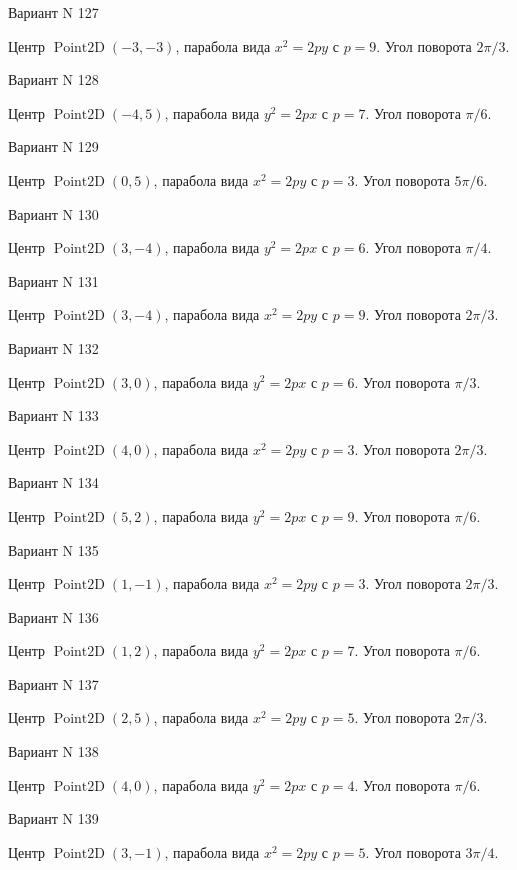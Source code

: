 \documentclass[11pt]{report}
\begin{document}
Вариант N 127

Центр $\operatorname{Point2D}\left(-3, -3\right)$, парабола вида $x^{2} = 2py$ с $p = 9$. Угол поворота $2 \pi / 3$.

Вариант N 128

Центр $\operatorname{Point2D}\left(-4, 5\right)$, парабола вида $y^{2} = 2px$ с $p = 7$. Угол поворота $\pi / 6$.

Вариант N 129

Центр $\operatorname{Point2D}\left(0, 5\right)$, парабола вида $x^{2} = 2py$ с $p = 3$. Угол поворота $5 \pi / 6$.

Вариант N 130

Центр $\operatorname{Point2D}\left(3, -4\right)$, парабола вида $y^{2} = 2px$ с $p = 6$. Угол поворота $\pi / 4$.

Вариант N 131

Центр $\operatorname{Point2D}\left(3, -4\right)$, парабола вида $x^{2} = 2py$ с $p = 9$. Угол поворота $2 \pi / 3$.

Вариант N 132

Центр $\operatorname{Point2D}\left(3, 0\right)$, парабола вида $y^{2} = 2px$ с $p = 6$. Угол поворота $\pi / 3$.

Вариант N 133

Центр $\operatorname{Point2D}\left(4, 0\right)$, парабола вида $x^{2} = 2py$ с $p = 3$. Угол поворота $2 \pi / 3$.

Вариант N 134

Центр $\operatorname{Point2D}\left(5, 2\right)$, парабола вида $y^{2} = 2px$ с $p = 9$. Угол поворота $\pi / 6$.

Вариант N 135

Центр $\operatorname{Point2D}\left(1, -1\right)$, парабола вида $x^{2} = 2py$ с $p = 3$. Угол поворота $2 \pi / 3$.

Вариант N 136

Центр $\operatorname{Point2D}\left(1, 2\right)$, парабола вида $y^{2} = 2px$ с $p = 7$. Угол поворота $\pi / 6$.

Вариант N 137

Центр $\operatorname{Point2D}\left(2, 5\right)$, парабола вида $x^{2} = 2py$ с $p = 5$. Угол поворота $2 \pi / 3$.

Вариант N 138

Центр $\operatorname{Point2D}\left(4, 0\right)$, парабола вида $y^{2} = 2px$ с $p = 4$. Угол поворота $\pi / 6$.

Вариант N 139

Центр $\operatorname{Point2D}\left(3, -1\right)$, парабола вида $x^{2} = 2py$ с $p = 5$. Угол поворота $3 \pi / 4$.
\end{document}
